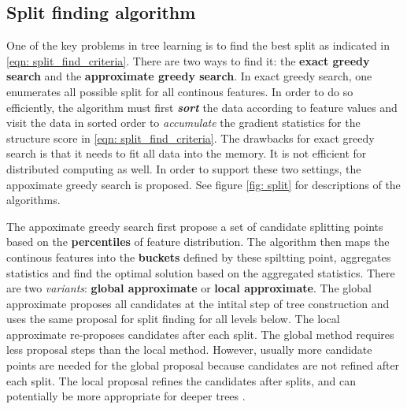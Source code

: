 \documentclass[11pt]{article}
\begin{document}
\subsection{Split finding algorithm}
One of the key problems in tree learning is to find the best split as indicated in \eqref{eqn: split_find_criteria}. There are two ways to find it: the \textbf{exact greedy search} and the \textbf{approximate greedy search}. In exact greedy search, one enumerates all possible split for all continous features. In order to do so efficiently, the algorithm must first \emph{\textbf{sort}} the data according to feature values and visit the data in sorted order to \emph{accumulate} the gradient statistics for the structure score in \eqref{eqn: split_find_criteria}. The drawbacks for exact greedy search is that it needs to fit all data into the memory. It is not efficient for distributed computing as well. In order to support these two settings, the appoximate greedy search is proposed. See figure \ref{fig: split} for descriptions of the algorithms.

The appoximate greedy search first propose a set of candidate splitting points based on the \textbf{percentiles} of feature distribution. The algorithm then maps the continous features into the \textbf{buckets} defined by these spiltting point, aggregates statistics and find the optimal solution based on the aggregated statistics. There are two \emph{variants}: \textbf{global approximate} or \textbf{local approximate}. The global approximate proposes all candidates at the intital step of tree construction and uses the same proposal for split finding for all levels below. The local approximate re-proposes candidates after each split. The global method requires less proposal steps than the local method. However, usually more candidate points are needed for the global proposal because candidates are not refined after each split. The local proposal refines the candidates after splits, and can potentially be more appropriate for deeper trees \citep{chen2016xgboost}.
\end{document}
